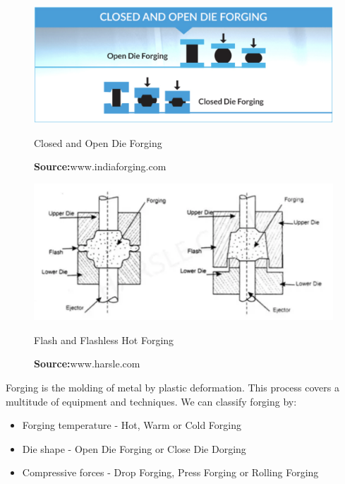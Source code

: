\begin{figure}[h]
  \centering
  \begin{minipage}[b]{0.4\textwidth}
    \includegraphics[width=\textwidth]{./Images/closedopen_die.png}
    \caption{Closed and Open Die Forging}
    \label{OpenClosedDied}
    \caption*{\textbf{Source:}www.indiaforging.com}
  \end{minipage}
  \hfill
  \begin{minipage}[b]{0.4\textwidth}
    \includegraphics[width=\textwidth]{./Images/Flashless_die.png}
    \caption{Flash and Flashless Hot Forging}
    \label{Flashforging}
    \caption*{\textbf{Source:}www.harsle.com}
  \end{minipage}
\end{figure}

Forging is the molding of metal by plastic deformation. This process covers a multitude of equipment and techniques.
We can classify forging by:
\begin{itemize}
    \item Forging temperature - Hot, Warm or Cold Forging
    \item Die shape - Open Die Forging or Close Die Dorging
    \item Compressive forces - Drop Forging, Press Forging or Rolling Forging
\end{itemize}

